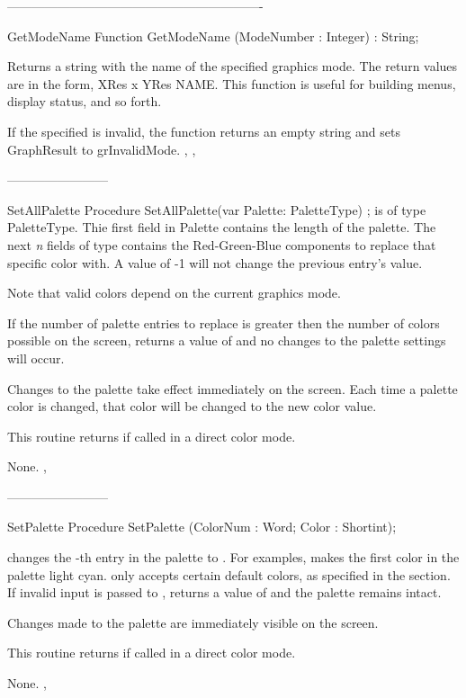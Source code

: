 -------------------------------------------------------------
\begin{function}{GetModeName}
\Declaration
Function GetModeName (ModeNumber : Integer) : String;

\Description

Returns a string with the name of the specified graphics mode. The
return values are in the form, XRes x YRes NAME. This function is
useful for building menus, display status, and so forth.

\Errors
If the specified  is invalid, the function returns an
empty string and sets GraphResult to grInvalidMode.
\SeeAlso
{}, , 
\end{function}
------------------------
\begin{procedure}{SetAllPalette}
\Declaration
Procedure SetAllPalette(var Palette: PaletteType) ;
\Description
{} is of type PaletteType. Thie first field in Palette
contains the length of the palette. The next \textit{n} fields of
type  contains the Red-Green-Blue components to replace
that specific color with. A value of -1 will not change the previous
entry's value.

Note that valid colors depend on the current graphics mode.

If the number of palette entries to replace is greater then the
number of colors possible on the screen,  returns
a value of  and no changes to the palette settings will
occur.

Changes to the palette take effect immediately on the screen. Each time
a palette color is changed, that color will be changed to the new color
value.

This routine returns  if called in a direct color mode.

\Errors
None.
\SeeAlso
{}, 
\end{procedure}
------------------------
\begin{procedure}{SetPalette}
\Declaration
Procedure SetPalette (ColorNum : Word; Color : Shortint);

\Description
{} changes the -th entry in the palette to
. For examples,  makes the first
color in the palette light cyan.  only accepts certain default
colors, as specified in the  section. If invalid
input is passed to ,  returns a value
of  and the palette remains intact.

Changes made to the palette are immediately visible on the screen.

This routine returns  if called in a direct color mode.

\Errors
None.
\SeeAlso
{},
\end{procedure}


